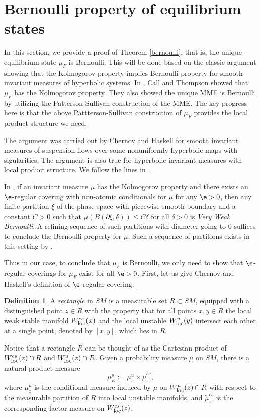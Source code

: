 \documentclass[11pt]{amsart}
\theoremstyle{definition}
\newtheorem{definition}[theorem]{Definition}
\def\loc{{\mathop{\hbox{\footnotesize  \rm loc}}}}
\def\d{\delta}   %
\begin{document}
\section{Bernoulli property of equilibrium states}
In this section, we provide a proof of Theorem \ref{bernoulli}, that is, the unique equilibrium state $\mu_F$ is Bernoulli. This will be done based on the classic argument showing that the Kolmogorov property implies Bernoulli property for smooth invariant measures of hyperbolic systems. In \cite{CT}, Call and Thompson showed that $\mu_F$ has the Kolmogorov property. They also showed the unique MME is Bernoulli by utilizing the Patterson-Sullivan construction of the MME. The key progress here is that the above Pattterson-Sullivan construction of $\mu_F$ provides the local product structure we need.

The argument was carried out by Chernov and Haskell \cite{CH} for smooth invariant measures of suspension flows over some nonuniformly hyperbolic maps with sigularities. The argument is also true for hyperbolic invariant measures with local product structure. We follow the lines in \cite[Section 7]{CT}.

In \cite{CH}, if an invariant measure $\mu$ has the Kolmogorov property and there exists an $\e$-regular covering
with non-atomic conditionals for $\mu$ for any $\e > 0$, then any finite partition $\xi$ of the
phase space with piecewise smooth boundary and a constant $C > 0$ such that
$\mu(B(\partial \xi, \d)) \le C\d$ for all $\d > 0$ is \emph{Very Weak Bernoulli}. A refining sequence of such
partitions with diameter going to $0$ suffices to conclude the Bernoulli property for
$\mu$. Such a sequence of partitions exists in this setting by \cite[Lemma 4.1]{OW}. 

Thus in our case, to conclude that $\mu_F$ is Bernoulli, we only need to show that $\e$-regular coverings for $\mu_F$ exist for all $\e > 0$. First, let us give Chernov and Haskell's definition of $\e$-regular covering.

\begin{definition}\label{recdef}
A \emph{rectangle} in $SM$ is a measurable set $R\subset SM$, equipped with a distinguished point $z \in R$ with the property that for all points $x, y \in R$ the local weak stable manifold $W_\loc^{cs}(x)$ and the local unstable $W_\loc^{u}(y)$ intersect each other at a single point, denoted by $[x,y]$, which lies in $R$.
\end{definition}
Notice that a rectangle $R$ can be thought of as the Cartesian product of $W_\loc^{cs}(z)\cap R$ and $W_\loc^{u}(z)\cap R$. Given a probability measure $\mu$ on $SM$, there is a natural product measure
$$\mu^p_R:=\mu^u_z\times \tilde\mu^{cs}_z,$$
where $\mu^u_z$ is the conditional measure induced by $\mu$ on $W_\loc^u(z)\cap R$ with respect to the measurable partition of $R$ into local unstable manifolds, and $\tilde\mu^{cs}_z$ is the corresponding factor measure on $W^{cs}_\loc(z)$.
\end{document}
